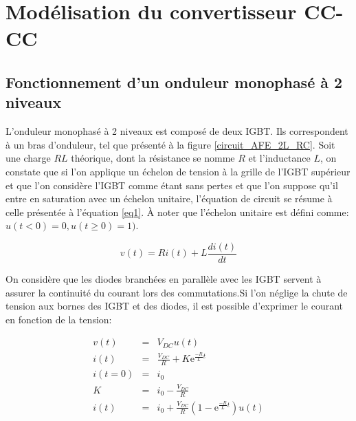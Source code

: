 \chapter{Modélisation du convertisseur CC-CC}
\section{Fonctionnement d'un onduleur monophasé à 2 niveaux}
L'onduleur monophasé à 2 niveaux est composé de deux IGBT. Ils correspondent à un bras d'onduleur, tel que présenté à la figure \ref{circuit_AFE_2L_RC}. Soit une charge $RL$ théorique, dont la résistance se nomme $R$ et l'inductance $L$, on constate que si l'on applique un échelon de tension à la grille de l'IGBT supérieur et que l'on considère l'IGBT comme étant sans pertes et que l'on suppose qu'il entre en saturation avec un échelon unitaire, l'équation de circuit se résume à celle présentée à l'équation \ref{eq1}. À noter que l'échelon unitaire est défini comme: $u(t<0) = 0, u(t\geq 0) = 1)$.

\begin{equation}
\label{eq1}
v(t) = R i(t) + L \frac{d i(t)}{dt}
\end{equation}

On considère que les diodes branchées en parallèle avec les IGBT servent à assurer la continuité du courant lors des commutations.Si l'on néglige la chute de tension aux bornes des IGBT et des diodes, il est possible d'exprimer le courant en fonction de la tension:

\begin{eqnarray}
v(t) &=& V_{DC} u(t)\\
i(t) &=& \frac{V_{DC}}{R} + K \mbox{e}^{\frac{-R}{L}t}\\
i(t=0) &=& i_0\\
K &=& i_0 - \frac{V_{DC}}{R} \\
i(t) &=& i_0  + \frac{V_{DC}}{R}\left(1 - \mbox{e}^{\frac{-R}{L}t}\right)u(t)
\end{eqnarray}

